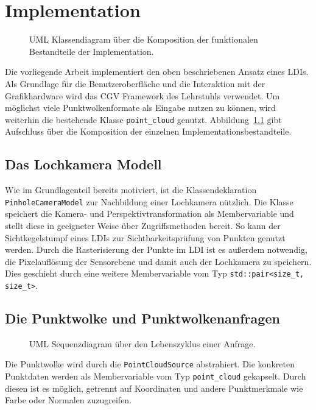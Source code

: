 \documentclass[hyperref, beleg, german, final, twoside]{cgvpub}
\begin{document}
\chapter{Implementation}

\begin{figure}
	\centering
	
	\caption{UML Klassendiagram über die Komposition der funktionalen 
	Bestandteile der Implementation.}%
	\label{fig:umloverview}
\end{figure}

Die vorliegende Arbeit implementiert den oben beschriebenen Ansatz eines LDIs.
Als Grundlage für die Benutzeroberfläche und die Interaktion mit der
Grafikhardware wird das CGV Framework des Lehrstuhls verwendet. Um möglichst
viele Punktwolkenformate als Eingabe nutzen zu können, wird weiterhin die
bestehende Klasse \texttt{point\_cloud} genutzt.
Abbildung~\ref{fig:umloverview} gibt Aufschluss über die Komposition der
einzelnen Implementationsbestandteile.

\section{Das Lochkamera Modell}

Wie im Grundlagenteil bereits motiviert, ist die Klassendeklaration
\texttt{PinholeCameraModel} zur Nachbildung einer Lochkamera nützlich. Die
Klasse speichert die Kamera- und Perspektivtransformation als Membervariable
und stellt diese in geeigneter Weise über Zugriffsmethoden bereit. So kann der
Sichtkegelstumpf eines LDIs zur Sichtbarkeitsprüfung von Punkten genutzt
werden. Durch die Rasterisierung der Punkte im LDI ist es außerdem notwendig,
die Pixelauflösung der Sensorebene und damit auch der Lochkamera zu speichern.
Dies geschieht durch eine weitere Membervariable vom Typ
\texttt{std::pair<size\_t, size\_t>}.

\section{Die Punktwolke und Punktwolkenanfragen}

\begin{figure}
	\centering
	
	\caption{UML Sequenzdiagram über den Lebenszyklus einer 
	Anfrage.}%
	\label{fig:umlquerylife}
\end{figure}

Die Punktwolke wird durch die \texttt{PointCloudSource} abstrahiert. Die
konkreten Punktdaten werden als Membervariable vom Typ \texttt{point\_cloud}
gekapselt. Durch diesen ist es möglich, getrennt auf Koordinaten und andere
Punktmerkmale wie Farbe oder Normalen zuzugreifen.
\end{document}
